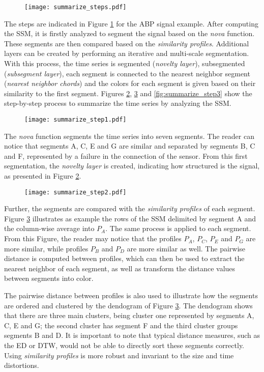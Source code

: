 {\begin{figure}
\centering
\texttt{[image: summarize\_steps.pdf]}
\label{fig:summarize_steps}
\end{figure}

The steps are indicated in Figure \ref{fig:summarize_steps} for the \gls{ABP} signal example. After computing the \gls{SSM}, it is firstly analyzed to segment the signal based on the \textit{nova} function. These segments are then compared based on the \textit{similarity profiles}. Additional layers can be created by performing an iterative and multi-scale segmentation. With this process, the time series is segmented (\textit{novelty layer}), subsegmented (\textit{subsegment layer}), each segment is connected to the nearest neighbor segment (\textit{nearest neighbor chords}) and the colors for each segment is given based on their similarity to the first segment. Figures \ref{fig:summarize_step1}, \ref{fig:summarize_step2} and \ref{fig:summarize_step3} show the step-by-step process to summarize the time series by analyzing the \gls{SSM}. 

\begin{figure}
\centering
\texttt{[image: summarize\_step1.pdf]}
\label{fig:summarize_step1}
\end{figure}

The \textit{nova} function segments the time series into seven segments. The reader can notice that segments A, C, E and G are similar and separated by segments B, C and F, represented by a failure in the connection of the sensor. From this first segmentation, the \textit{novelty layer} is created, indicating how structured is the signal, as presented in Figure \ref{fig:summarize_step1}.

\begin{figure}[b]
\centering
\texttt{[image: summarize\_step2.pdf]}
\label{fig:summarize_step2}
\end{figure}

Further, the segments are compared with the \textit{similarity profiles} of each segment. Figure \ref{fig:summarize_step2} illustrates as example the rows of the \gls{SSM} delimited by segment A and the column-wise average into $P_A$. The same process is applied to each segment. From this Figure, the reader may notice that the profiles $P_A$, $P_C$, $P_E$ and $P_G$ are more similar, while profiles $P_B$ and $P_D$ are more similar as well. The pairwise distance is computed between profiles, which can then be used to extract the nearest neighbor of each segment, as well as transform the distance values between segments into color. 
\par
The pairwise distance between profiles is also used to illustrate how the segments are ordered and clustered by the dendogram of Figure \ref{fig:summarize_step2}. The dendogram shows that there are three main clusters, being cluster one represented by segments A, C, E and G; the second cluster has segment F and the third cluster groups segments B and D. It is important to note that typical distance measures, such as the \gls{ED} or \gls{DTW}, would not be able to directly sort these segments correctly. Using \textit{similarity profiles} is more robust and invariant to the size and time distortions. 

}
